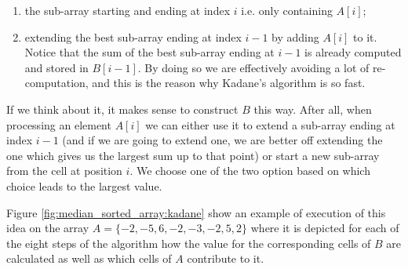 \begin{enumerate}
	\item the sub-array starting and ending at index $i$ i.e. only containing $A[i]$;
	\item extending the best sub-array ending at index $i-1$ by adding $A[i]$ to it. Notice that the sum of the
	best sub-array ending at $i-1$ is already computed and stored in $B[i-1]$. By doing so we are
	effectively avoiding a lot of re-computation, and this is the reason why Kadane's algorithm is
	so fast.
\end{enumerate}
If we think about it, it makes sense to construct $B$ this way. After all, when processing an element $A[i]$ we can either use it to extend a sub-array ending at index $i-1$ (and if we are going to extend one, we are better off extending the one which gives us the largest sum up to that point) or start a new sub-array from the cell at position $i$. We choose one of the two option based on which choice leads to the largest value. 

Figure \ref{fig:median_sorted_array:kadane} show an example of execution of this idea on the array $A=\{-2,-5,6,-2,-3,-2,5,2\}$ where it is depicted for each of the eight steps of the algorithm how the value for the corresponding cells of $B$ are calculated as well as which cells of $A$ contribute to it.

